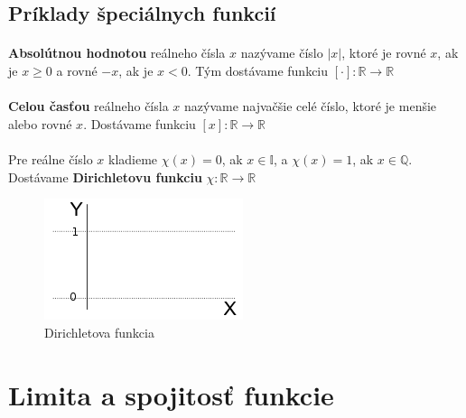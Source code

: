 \documentclass[12pt,a4paper]{article}
\begin{document}
\subsection{Príklady špeciálnych funkcií}
\paragraph{}
\textbf{Absolútnou hodnotou} reálneho čísla $x$ nazývame číslo $|x|$, ktoré je rovné $x$, ak je $x\geq 0$ a rovné $-x$, ak je $x<0$. Tým dostávame funkciu $[\cdot]:\mathds{R}\rightarrow\mathds{R}$ \\ \vspace{-1cm}
\paragraph{}
\textbf{Celou časťou} reálneho čísla $x$ nazývame najvačšie celé číslo, ktoré je menšie alebo rovné $x$. Dostávame funkciu $[x]:\mathds{R}\rightarrow\mathds{R}$ \\ \vspace{-1cm}
\paragraph{}
Pre reálne číslo $x$ kladieme $\chi(x)=0$, ak $x\in \mathds{I}$, a $\chi(x)=1$, ak $x\in \mathds{Q}$. Dostávame \textbf{Dirichletovu funkciu} $\chi:\mathds{R}\rightarrow\mathds{R}$

\begin{figure}[ht]
	\begin{center}
		\includegraphics{img/dirichletova_funkce}
	\end{center}
	\caption{Dirichletova funkcia}
\end{figure}

\section{Limita a spojitosť funkcie}
\end{document}
